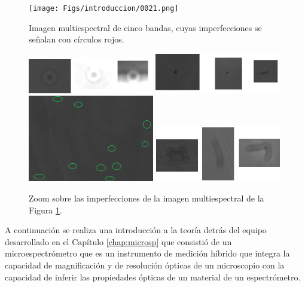 \begin{figure}[H]
	\centering
	\texttt{[image: Figs/introduccion/0021.png]}
	\caption{Imagen multiespectral de cinco bandas, cuyas imperfecciones se señalan con círculos rojos.}
	\label{fig:speus}
\end{figure}

\begin{figure}[H]
\includegraphics[width=0.49\textwidth]{Figs/introduccion/agimgg.png}\hfill
\includegraphics[width=0.49\textwidth]{Figs/introduccion/manc.png}
\\[\smallskipamount]
\includegraphics[width=0.49\textwidth]{Figs/introduccion/agjj.png}\hfill
\includegraphics[width=0.49\textwidth]{Figs/introduccion/def2.png}
\caption{Zoom sobre las imperfecciones de la imagen multiespectral de la Figura \ref{fig:speus}.}
\label{fig:imgdefs}
\end{figure}

A continuación se realiza una introducción a la teoría detrás del equipo desarrollado en el Capítulo \ref{chap:microsp} que consistió de un microespectrómetro que es un instrumento de medición híbrido que integra la capacidad de magnificación y de resolución ópticas de un microscopio con la capacidad de inferir las propiedades ópticas de un material de un espectrómetro.

